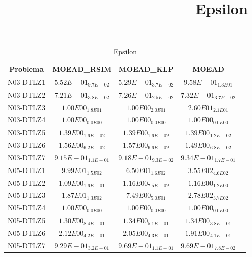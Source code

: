 \documentclass{article}
\title{Epsilon}
\author{}
\begin{document}
\maketitle
\begin{table*}[ht!]
\scriptsize
\caption{Epsilon}
\centering\begin{tabular}{|c||c||c||c||c|} \hline
Problema &MOEAD_RSIM &MOEAD_KLP &MOEAD\\\hline
N03-DTLZ1 &\cellcolor{gray25}$5.52E-01_{9.7E-02}$ &\cellcolor{gray95}$5.29E-01_{3.7E-02}$ &$9.58E-01_{1.3E01}$\\ 
\hline
N03-DTLZ2 &\cellcolor{gray95}$7.21E-01_{3.8E-02}$ &\cellcolor{gray25}$7.26E-01_{2.5E-02}$ &$7.32E-01_{3.7E-02}$\\ 
\hline
N03-DTLZ3 &\cellcolor{gray95}$1.00E00_{1.8E01}$ &\cellcolor{gray25}$1.00E00_{2.0E01}$ &$2.60E01_{2.1E01}$\\ 
\hline
N03-DTLZ4 &\cellcolor{gray95}$1.00E00_{0.0E00}$ &\cellcolor{gray25}$1.00E00_{0.0E00}$ &$1.00E00_{0.0E00}$\\ 
\hline
N03-DTLZ5 &$1.39E00_{1.6E-02}$ &\cellcolor{gray95}$1.39E00_{1.6E-02}$ &\cellcolor{gray25}$1.39E00_{1.2E-02}$\\ 
\hline
N03-DTLZ6 &\cellcolor{gray25}$1.56E00_{6.2E-02}$ &$1.57E00_{6.6E-02}$ &\cellcolor{gray95}$1.49E00_{6.8E-02}$\\ 
\hline
N03-DTLZ7 &\cellcolor{gray95}$9.15E-01_{1.1E-01}$ &\cellcolor{gray25}$9.18E-01_{9.3E-02}$ &$9.34E-01_{1.7E-01}$\\ 
\hline
N05-DTLZ1 &\cellcolor{gray25}$9.99E01_{1.5E02}$ &\cellcolor{gray95}$6.50E01_{1.6E02}$ &$3.55E02_{4.6E02}$\\ 
\hline
N05-DTLZ2 &\cellcolor{gray95}$1.09E00_{1.6E-01}$ &\cellcolor{gray25}$1.16E00_{7.5E-02}$ &$1.16E00_{1.2E00}$\\ 
\hline
N05-DTLZ3 &\cellcolor{gray25}$1.87E01_{1.3E02}$ &\cellcolor{gray95}$7.49E00_{5.0E01}$ &$2.78E02_{3.7E02}$\\ 
\hline
N05-DTLZ4 &\cellcolor{gray95}$1.00E00_{0.0E00}$ &\cellcolor{gray25}$1.00E00_{0.0E00}$ &$1.00E00_{0.0E00}$\\ 
\hline
N05-DTLZ5 &\cellcolor{gray95}$1.30E00_{8.4E-01}$ &$1.34E00_{5.1E-01}$ &\cellcolor{gray25}$1.34E00_{3.8E-01}$\\ 
\hline
N05-DTLZ6 &$2.12E00_{4.2E-01}$ &\cellcolor{gray25}$2.05E00_{4.3E-01}$ &\cellcolor{gray95}$1.91E00_{4.1E-01}$\\ 
\hline
N05-DTLZ7 &\cellcolor{gray95}$9.29E-01_{3.2E-01}$ &$9.69E-01_{1.1E-01}$ &\cellcolor{gray25}$9.69E-01_{7.8E-02}$\\ 

\end{tabular}
\end{table*}
\end{document}
